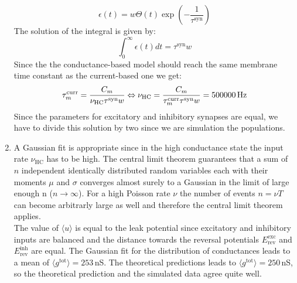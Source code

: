 \documentclass[12pt]{article}
\newenvironment{exercise}[2][Exercise]{\begin{trivlist}
\item[\hskip \labelsep {\bfseries #1}\hskip \labelsep {\bfseries #2.}]}{\end{trivlist}}
\begin{document}
\begin{exercise}{4.1}
\begin{enumerate}
  \begin{equation}
    \epsilon(t) = w\Theta(t)\exp{\left(-\frac{1}{\tau^{\text{syn}}}\right)}
  \end{equation}
  The solution of the integral is given by:
  \begin{equation}
    \int_0^\infty \epsilon(t)dt = \tau^{\text{syn}}w
  \end{equation}
  Since the the conductance-based model should reach the same membrane time constant as the current-based one we get:
  \begin{equation}
    \tau_m^{\text{curr}} = \frac{C_m}{\nu_{\text{HC}}\tau^{\text{syn}}w} \Leftrightarrow \nu_{\text{HC}} = \frac{C_m}{\tau_m^{\text{curr}}\tau^{\text{syn}}w} = 500000\text{\,Hz}
  \end{equation}
  Since the parameters for excitatory and inhibitory synapses are equal, we have to divide this solution by two since we are simulation the populations.
  \item A Gaussian fit is appropriate since in the high conductance state the input rate $\nu_{\text{HC}}$ has to be high. The central limit theorem guarantees that a sum of $n$ independent identically distributed random variables each with their moments $\mu$ and $\sigma$ converges almost surely to a Gaussian in the limit of large enough n ($n\rightarrow\infty$). For a high Poisson rate $\nu$ the number of events $n=\nu T$ can become arbitrarly large as well and therefore the central limit theorem applies. \\
  The value of $\langle u \rangle$ is equal to the leak potential since excitatory and inhibitory inputs are balanced and the distance towards the reversal potentials $E_{\text{rev}}^{\text{exc}}$ and $E_{\text{rev}}^{\text{inh}}$ are equal.
  The Gaussian fit for the distribution of conductances leads to a mean of $\langle g^{\text{tot}} \rangle = 253$\,nS. The theoretical predictions leads to $\langle g^{\text{tot}} \rangle = 250$\,nS, so the theoretical prediction and the simulated data agree quite well.

\end{enumerate}
\end{exercise}
\end{document}
